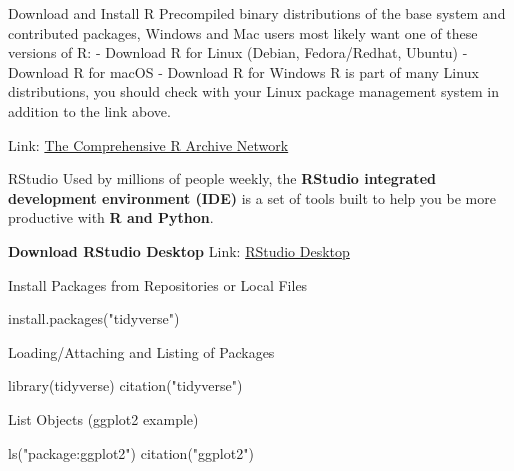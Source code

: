 \documentclass[
  ignorenonframetext,
]{beamer}
\newenvironment{Shaded}{\begin{snugshade}}{\end{snugshade}}
\newcommand{\FunctionTok}[1]{\textcolor[rgb]{0.94,0.94,0.56}{#1}}
\newcommand{\NormalTok}[1]{\textcolor[rgb]{0.80,0.80,0.80}{#1}}
\newcommand{\StringTok}[1]{\textcolor[rgb]{0.80,0.58,0.58}{#1}}
\begin{document}
\begin{frame}{Download and Install R}
\protect\hypertarget{download-and-install-r}{}
Precompiled binary distributions of the base system and contributed
packages, Windows and Mac users most likely want one of these versions
of R: - Download R for Linux (Debian, Fedora/Redhat, Ubuntu) - Download
R for macOS - Download R for Windows R is part of many Linux
distributions, you should check with your Linux package management
system in addition to the link above.

Link: \href{https://brieger.esalq.usp.br/CRAN/}{The Comprehensive R
Archive Network}
\end{frame}

\begin{frame}{RStudio}
\protect\hypertarget{rstudio}{}
Used by millions of people weekly, the \textbf{RStudio integrated
development environment (IDE)} is a set of tools built to help you be
more productive with \textbf{R and Python}.

\textbf{Download RStudio Desktop} Link:
\href{https://posit.co/download/rstudio-desktop/}{RStudio Desktop}
\end{frame}

\begin{frame}[fragile]{Install Packages from Repositories or Local
Files}
\protect\hypertarget{install-packages-from-repositories-or-local-files}{}
\begin{Shaded}
\begin{Highlighting}[]
\FunctionTok{install.packages}\NormalTok{(}\StringTok{"tidyverse"}\NormalTok{)}
\end{Highlighting}
\end{Shaded}
\end{frame}

\begin{frame}[fragile]{Loading/Attaching and Listing of Packages}
\protect\hypertarget{loadingattaching-and-listing-of-packages}{}
\begin{Shaded}
\begin{Highlighting}[]
\FunctionTok{library}\NormalTok{(tidyverse)}
\FunctionTok{citation}\NormalTok{(}\StringTok{"tidyverse"}\NormalTok{)}
\end{Highlighting}
\end{Shaded}
\end{frame}

\begin{frame}[fragile]{List Objects (ggplot2 example)}
\protect\hypertarget{list-objects-ggplot2-example}{}
\begin{Shaded}
\begin{Highlighting}[]
\FunctionTok{ls}\NormalTok{(}\StringTok{"package:ggplot2"}\NormalTok{)}
\FunctionTok{citation}\NormalTok{(}\StringTok{"ggplot2"}\NormalTok{)}
\end{Highlighting}
\end{Shaded}
\end{frame}
\end{document}
